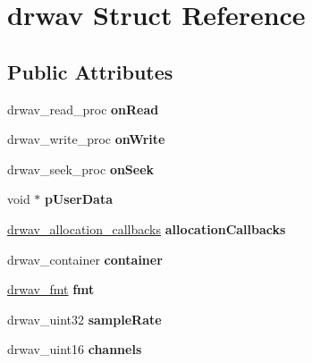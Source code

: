 \hypertarget{structdrwav}{}\section{drwav Struct Reference}
\label{structdrwav}
\subsection*{Public Attributes}
\begin{DoxyCompactItemize}
\item 
\mbox{\label{structdrwav_ab08d1b37037df5b2af88cc549d93b550}} 
drwav\+\_\+read\+\_\+proc {\bfseries on\+Read}
\item 
\mbox{\label{structdrwav_a1ca22d7ee1b573fe1d758e131f486e60}} 
drwav\+\_\+write\+\_\+proc {\bfseries on\+Write}
\item 
\mbox{\label{structdrwav_a71fa3abce7f96f79ba2e791fb97ed256}} 
drwav\+\_\+seek\+\_\+proc {\bfseries on\+Seek}
\item 
\mbox{\label{structdrwav_a99247627375ce8b99dbd26eb4540a10a}} 
void $\ast$ {\bfseries p\+User\+Data}
\item 
\mbox{\label{structdrwav_a6c29e2b12103ca5e7dae69367993d83e}} 
\mbox{\hyperlink{structdrwav__allocation__callbacks}{drwav\+\_\+allocation\+\_\+callbacks}} {\bfseries allocation\+Callbacks}
\item 
\mbox{\label{structdrwav_a287fdd02d1fd755e827609b857141cbe}} 
drwav\+\_\+container {\bfseries container}
\item 
\mbox{\label{structdrwav_a85813f6f6280c2b79abff00aa332e78a}} 
\mbox{\hyperlink{structdrwav__fmt}{drwav\+\_\+fmt}} {\bfseries fmt}
\item 
\mbox{\label{structdrwav_a6f3a893019f8b2b0bcc1939d48ae2da5}} 
drwav\+\_\+uint32 {\bfseries sample\+Rate}
\item 
\mbox{\label{structdrwav_a62c845e3c6f6309850c42cd64ea6616e}} 
drwav\+\_\+uint16 {\bfseries channels}
\item 
\mbox{\label{structdrwav_ab712d32dcc6b9c132ae43caf00827ea8}} 

\end{DoxyCompactItemize}
